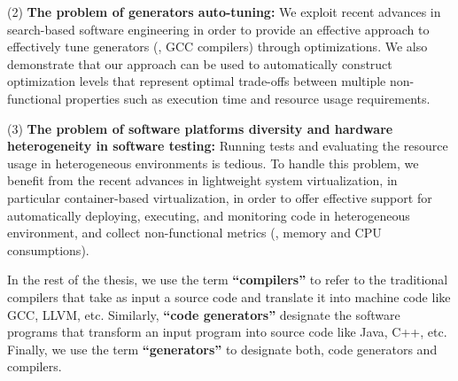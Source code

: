 	(2) \textbf{The problem of generators auto-tuning:}  
	We exploit recent advances in search-based software engineering in order to provide an effective approach to effectively tune generators (\eg, GCC compilers) through optimizations. We also demonstrate that our approach can be used to automatically construct optimization levels that represent optimal trade-offs between multiple non-functional properties such as execution time and resource usage requirements. 

	(3) \textbf{The problem of software platforms diversity and hardware heterogeneity in software testing:} Running tests and evaluating the resource usage in heterogeneous environments is tedious. To handle this problem, we benefit from the recent advances in lightweight system virtualization, in particular container-based virtualization, in order to offer effective support for automatically deploying, executing, and monitoring code in heterogeneous environment, and collect non-functional metrics (\eg, memory and CPU consumptions).
	
\newpage
In the rest of the thesis, we use the term \textbf{``compilers''} to refer to the traditional compilers that take as input a source code and translate it into machine code like GCC, LLVM, etc. Similarly, \textbf{``code generators''} designate the software programs that transform an input program into source code like Java, C++, etc. Finally, we use the term \textbf{``generators''} to designate both, code generators and compilers. 

